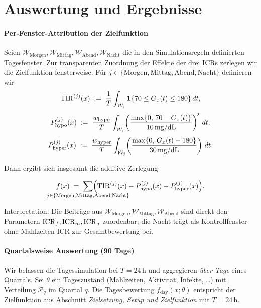 \section{Auswertung und Ergebnisse}

\paragraph{Per-Fenster-Attribution der Zielfunktion}
Seien \(\mathcal W_{\mathrm{Morgen}}, \mathcal W_{\mathrm{Mittag}}, \mathcal W_{\mathrm{Abend}}, \mathcal W_{\mathrm{Nacht}}\) die in den Simulationsregeln definierten Tagesfenster. Zur transparenten Zuordnung der Effekte der drei ICRs zerlegen wir die Zielfunktion fensterweise. Für \(j\in\{\mathrm{Morgen},\mathrm{Mittag},\mathrm{Abend},\mathrm{Nacht}\}\) definieren wir
\[
\mathrm{TIR}^{(j)}(x)\;:=\;\frac{1}{T}\int_{\mathcal W_j} \mathbf{1}\{70\le G_x(t)\le 180\}\,dt,
\]
\[
P_{\mathrm{hypo}}^{(j)}(x)\;:=\;\frac{w_{\mathrm{hypo}}}{T}\int_{\mathcal W_j}\!\left(\frac{\max\{0,\,70-G_x(t)\}}{10\,\mathrm{mg/dL}}\right)^{\!2}\, dt.
\]
\[
P_{\mathrm{hyper}}^{(j)}(x)\;:=\;\frac{w_{\mathrm{hyper}}}{T}\int_{\mathcal W_j}\!\left(\frac{\max\{0,\,G_x(t)-180\}}{30\,\mathrm{mg/dL}}\right)\, dt.
\]
\medskip

\noindent Dann ergibt sich insgesamt die additive Zerlegung

\newcommand{\Jfen}{\{\mathrm{Morgen},\mathrm{Mittag},\mathrm{Abend},\mathrm{Nacht}\}}
\[
f(x) \;=\; \sum_{\mathclap{j\in\Jfen}}\Bigl(\mathrm{TIR}^{(j)}(x) - P_{\mathrm{hypo}}^{(j)}(x) - P_{\mathrm{hyper}}^{(j)}(x)\Bigr).
\]
\medskip

\noindent Interpretation: Die Beiträge aus \(\mathcal W_{\mathrm{Morgen}},\mathcal W_{\mathrm{Mittag}},\mathcal W_{\mathrm{Abend}}\) sind direkt den Parametern \(\mathrm{ICR}_f,\mathrm{ICR}_m,\mathrm{ICR}_a\) zuordenbar; die Nacht trägt als Kontrollfenster ohne Mahlzeiten-ICR zur Gesamtbewertung bei.
\medskip
\paragraph{Quartalsweise Auswertung (90 Tage)}
Wir belassen die Tagessimulation bei \(T=24\,\mathrm{h}\) und aggregieren \emph{über Tage} eines Quartals. Sei \(\theta\) ein Tageszustand (Mahlzeiten, Aktivität, Infekte, \ldots) mit Verteilung \(\mathcal P_q\) im Quartal \(q\). Die Tagesbewertung \(f_{\text{day}}(x;\theta)\) entspricht der Zielfunktion aus Abschnitt \emph{Zielsetzung, Setup und Zielfunktion} mit \(T=24\,\mathrm{h}\).

